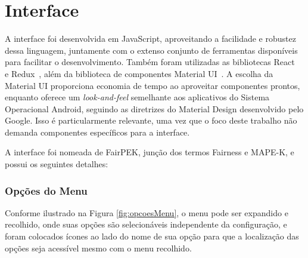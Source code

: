 \documentclass[Portugues,Final]{ic-tese-v3}
\begin{document}
\section{Interface}
\label{sec:interface}

A interface foi desenvolvida em JavaScript, aproveitando a facilidade e robustez dessa linguagem, juntamente com o extenso conjunto de ferramentas disponíveis para facilitar o desenvolvimento. Também foram utilizadas as bibliotecas React~\cite{React_2023} e Redux~\cite{Redux_2023}, além da biblioteca de componentes Material UI~\cite{MaterialUI_2023}. A escolha da Material UI proporciona economia de tempo ao aproveitar componentes prontos, enquanto oferece um \textit{look-and-feel} semelhante aos aplicativos do Sistema Operacional Android, seguindo as diretrizes do Material Design desenvolvido pelo Google. Isso é particularmente relevante, uma vez que o foco deste trabalho não demanda componentes específicos para a interface.

A interface foi nomeada de FairPEK, junção dos termos Fairness e MAPE-K, e possui os seguintes detalhes:

\subsubsection{Opções do Menu}

Conforme ilustrado na Figura \ref{fig:opcoesMenu}, o menu pode ser expandido e recolhido, onde suas opções são selecionáveis independente da configuração, e foram colocados ícones ao lado do nome de sua opção para que a localização das opções seja acessível mesmo com o menu recolhido.
\end{document}
